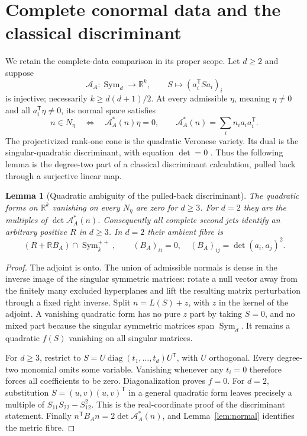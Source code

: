 \documentclass[11pt,reqno]{amsart}
\numberwithin{equation}{section}
\newtheorem{lemma}[theorem]{Lemma}
\theoremstyle{definition}\newtheorem{definition}[theorem]{Definition}
\theoremstyle{remark}\newtheorem{remark}[theorem]{Remark}
\newcommand{\R}{\mathbb R}
\newcommand{\Sym}{\operatorname{Sym}}
\newcommand{\diag}{\operatorname{diag}}
\begin{document}
\section{Complete conormal data and the classical discriminant}\label{sec:classical}
We retain the complete-data comparison in its proper scope. Let $d\ge2$ and suppose
\[
 \mathcal A_A:\Sym_d\longrightarrow\R^k,\qquad S\longmapsto(a_i^{\mathsf T}Sa_i)_i
\]
is injective; necessarily $k\ge d(d+1)/2$. At every admissible $\eta$, meaning $\eta\ne0$ and all $a_i^{\mathsf T}\eta\ne0$, its normal space satisfies
\[
 n\in N_\eta\quad\Longleftrightarrow\quad
 \mathcal A_A^*(n)\eta=0,\qquad
 \mathcal A_A^*(n)=\sum_i n_i a_i a_i^{\mathsf T}.
\]
The projectivized rank-one cone is the quadratic Veronese variety. Its dual is the singular-quadratic discriminant, with equation $\det=0$ \cite{GKZ}. Thus the following lemma is the degree-two part of a classical discriminant calculation, pulled back through a surjective linear map.

\begin{lemma}[Quadratic ambiguity of the pulled-back discriminant]\label{lem:classical}
The quadratic forms on $\R^k$ vanishing on every $N_\eta$ are zero for $d\ge3$. For $d=2$ they are the multiples of $\det\mathcal A_A^*(n)$. Consequently all complete second jets identify an arbitrary positive $R$ in $d\ge3$. In $d=2$ their ambient fibre is
\[
 (R+\R B_A)\cap\Sym_k^{++},\qquad
 (B_A)_{ii}=0,\quad(B_A)_{ij}=\det(a_i,a_j)^2.
\]
\end{lemma}
\begin{proof}
The adjoint is onto. The union of admissible normals is dense in the inverse image of the singular symmetric matrices: rotate a null vector away from the finitely many excluded hyperplanes and lift the resulting matrix perturbation through a fixed right inverse. Split $n=L(S)+z$, with $z$ in the kernel of the adjoint. A vanishing quadratic form has no pure $z$ part by taking $S=0$, and no mixed part because the singular symmetric matrices span $\Sym_d$. It remains a quadratic $f(S)$ vanishing on all singular matrices.

For $d\ge3$, restrict to $S=U\diag(t_1,\ldots,t_d)U^{\mathsf T}$, with $U$ orthogonal. Every degree-two monomial omits some variable. Vanishing whenever any $t_i=0$ therefore forces all coefficients to be zero. Diagonalization proves $f=0$. For $d=2$, substitution $S=(u,v)(u,v)^{\mathsf T}$ in a general quadratic form leaves precisely a multiple of $S_{11}S_{22}-S_{12}^2$. This is the real-coordinate proof of the discriminant statement. Finally $n^{\mathsf T}B_A n=2\det\mathcal A_A^*(n)$, and Lemma~\ref{lem:normal} identifies the metric fibre.
\end{proof}
\end{document}
